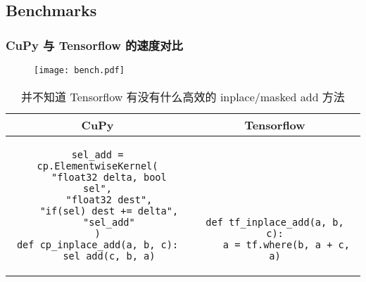 \documentclass[aspectratio=169]{beamer}
\begin{document}
\subsection{Benchmarks}
\begin{frame}
    \frametitle{CuPy 与 Tensorflow 的速度对比}

    \begin{figure}
        \centering
        \texttt{[image: bench.pdf]}
    \end{figure}

    \begin{table}
        \centering
        \begin{tabular}{|c|c|}
            CuPy & Tensorflow \\
            \hline
            \begin{minipage}[t]{0.5\textwidth}
                \begin{verbatim}
sel_add = cp.ElementwiseKernel(
    "float32 delta, bool sel",
    "float32 dest",
    "if(sel) dest += delta",
    "sel_add"
)
def cp_inplace_add(a, b, c):
    sel_add(c, b, a)
                \end{verbatim}
            \end{minipage}
                 &
            \begin{minipage}[t]{0.5\textwidth}
                \begin{verbatim}






def tf_inplace_add(a, b, c):
    a = tf.where(b, a + c, a)
                \end{verbatim}
            \end{minipage}
        \end{tabular}
        \caption{并不知道 Tensorflow 有没有什么高效的 inplace/masked add 方法}
    \end{table}

\end{frame}
\end{document}
